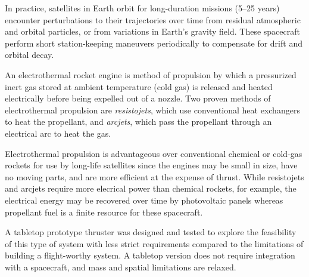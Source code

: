\documentclass[conference]{IEEEtran}
\begin{document}
In practice, satellites in Earth orbit for long-duration missions (5--25 years) encounter perturbations to their trajectories over time from residual atmospheric and orbital particles, or from variations in Earth's gravity field.
These spacecraft perform short station-keeping maneuvers periodically to compensate for drift and orbital decay.

An electrothermal rocket engine is method of propulsion by which a pressurized inert gas stored at ambient temperature (cold gas) is released and heated electrically before being expelled out of a nozzle.
Two proven methods of electrothermal propulsion are \emph{resistojets}, which use conventional heat exchangers to heat the propellant, and \emph{arcjets}, which pass the propellant through an electrical arc to heat the gas.

Electrothermal propulsion is advantageous over conventional chemical or cold-gas rockets for use by long-life satellites since the engines may be small in size, have no moving parts, and are more efficient at the expense of thrust.
While resistojets and arcjets require more elecrical power than chemical rockets, for example, the electrical energy may be recovered over time by photovoltaic panels whereas propellant fuel is a finite resource for these spacecraft.

A tabletop prototype thruster was designed and tested to explore the feasibility of this type of system with less strict requirements compared to the limitations of building a flight-worthy system.
A tabletop version does not require integration with a spacecraft, and mass and spatial limitations are relaxed.
\end{document}
